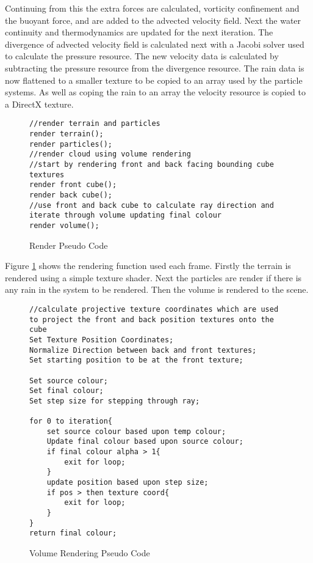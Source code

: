 Continuing from this the extra forces are calculated, vorticity confinement and the buoyant force, and are added to the advected velocity field.
Next the water continuity and thermodynamics are updated for the next iteration.
The divergence of advected velocity field is calculated next with a Jacobi solver used to calculate the pressure resource.
The new velocity data is calculated by subtracting the pressure resource from the divergence resource.
The rain data is now flattened to a smaller texture to be copied to an array used by the particle systems.
As well as coping the rain to an array the velocity resource is copied to a DirectX texture.

\begin{figure}[h|]
\centering
\begin{lstlisting}
//render terrain and particles
render terrain();
render particles();
//render cloud using volume rendering 
//start by rendering front and back facing bounding cube textures
render front cube();
render back cube(); 
//use front and back cube to calculate ray direction and iterate through volume updating final colour
render volume();
\end{lstlisting}
\caption{Render Pseudo Code}
\label{sc:RenderingPseudoCode}
\end{figure}

Figure \ref{sc:RenderingPseudoCode} shows the rendering function used each frame.
Firstly the terrain is rendered using a simple texture shader.
Next the particles are render if there is any rain in the system to be rendered.
Then the volume is rendered to the scene. 

\begin{figure}[h|]
\centering
\begin{lstlisting}
//calculate projective texture coordinates which are used to project the front and back position textures onto the cube
Set Texture Position Coordinates;
Normalize Direction between back and front textures;
Set starting position to be at the front texture;

Set source colour;
Set final colour;
Set step size for stepping through ray;
	
for 0 to iteration{
	set source colour based upon temp colour;
	Update final colour based upon source colour;
	if final colour alpha > 1{
		exit for loop;
	}
	update position based upon step size;
	if pos > then texture coord{
		exit for loop;
	}
}
return final colour;
\end{lstlisting}
\caption{Volume Rendering Pseudo Code}
\label{sc:Volume_rendering}
\end{figure}

